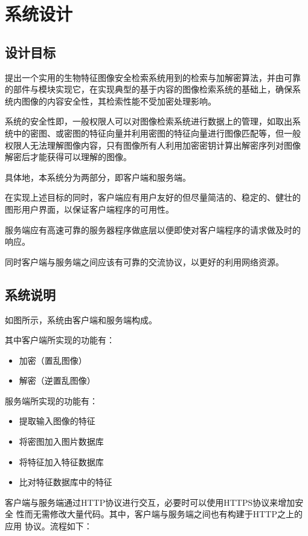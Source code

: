 
\chapter{系统设计}
\label{chap:sys-design}

\section{设计目标}
\label{sec:design-goal}
提出一个实用的生物特征图像安全检索系统用到的检索与加解密算法，并由可靠
的部件与模块实现它，在实现典型的基于内容的图像检索系统的基础上，确保系
统内图像的内容安全性，其检索性能不受加密处理影响。

系统的安全性即，一般权限人可以对图像检索系统进行数据上的管理，如取出系
统中的密图、或密图的特征向量并利用密图的特征向量进行图像匹配等，但一般
权限人无法理解图像内容，只有图像所有人利用加密密钥计算出解密序列对图像
解密后才能获得可以理解的图像。

具体地，本系统分为两部分，即客户端和服务端。

在实现上述目标的同时，客户端应有用户友好的但尽量简洁的、稳定的、健壮的
图形用户界面，以保证客户端程序的可用性。

服务端应有高速可靠的服务器程序做底层以便即使对客户端程序的请求做及时的
响应。

同时客户端与服务端之间应该有可靠的交流协议，以更好的利用网络资源。

\section{系统说明}
\label{sec:sys-description}

如图所示，系统由客户端和服务端构成。

其中客户端所实现的功能有：
\begin{itemize}
\item 加密（置乱图像）
\item 解密（逆置乱图像）
\end{itemize}

服务端所实现的功能有：
\begin{itemize}
\item 提取输入图像的特征
\item 将密图加入图片数据库
\item 将特征加入特征数据库
\item 比对特征数据库中的特征
\end{itemize}

客户端与服务端通过HTTP协议进行交互，必要时可以使用HTTPS协议来增加安全
性而无需修改大量代码。其中，客户端与服务端之间也有构建于HTTP之上的应用
协议。流程如下：


